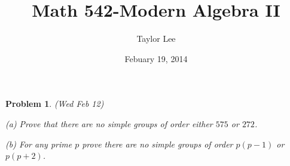 \documentclass[12pt]{article}
\theoremstyle{moo}
\newtheorem*{prob}{Problem}
\begin{document}
\fontseries {\seriesdefault}
\fontshape {\shapedefault}
\selectfont

\title{ Math 542-Modern Algebra II}
\date{Febuary 19, 2014}         %
\author{Taylor Lee}      %
\maketitle                      %



\begin{prob}(Wed Feb 12)
\par (a) Prove that there are no simple groups of order
either $575$ or $272$.
\par (b) For any prime $p$ prove there are no simple groups
of order $p(p-1)$ or $p(p+2)$.
\end{prob}
\end{document}
